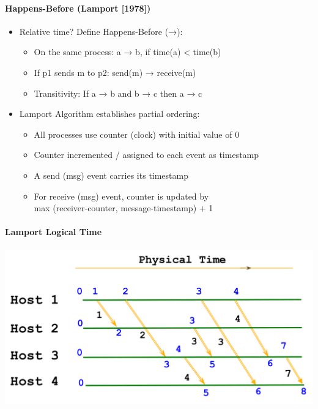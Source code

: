 \paragraph{Happens-Before (Lamport [1978])}
\begin{itemize}
\item Relative time? Define Happens-Before (→):
  \begin{itemize}
  \item On the same process: {\color{blue} a → b, if time(a) < time(b)}
  \item If p1 sends m to p2: {\color{blue} send(m) → receive(m)}
  \item Transitivity: {\color{blue} If a → b and b → c then a → c}
  \end{itemize}
\end{itemize}

\begin{itemize}
\item Lamport Algorithm establishes partial ordering:
  \begin{itemize}
  \item All processes use counter (clock) with initial value of 0
  \item Counter incremented / assigned to each event as timestamp
  \item A send (msg) event carries its timestamp
  \item For receive (msg) event, counter is updated by \\
    {\color{blue} max (receiver-counter, message-timestamp) + 1}
  \end{itemize}
\end{itemize}


\paragraph{Lamport Logical Time}

\includegraphics[scale=0.15]{graphics/lamport-logical-time.png}

